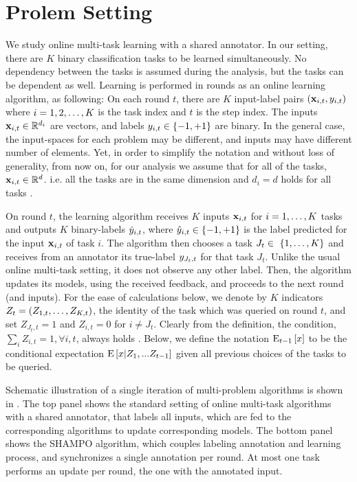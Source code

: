 \section{Prolem Setting}
\label{sec:setting}
We study online multi-task learning with a shared annotator. In our setting, there are
$K$  binary classification tasks to be learned simultaneously. 
No dependency between the tasks is assumed during the analysis, but the tasks can be dependent as well. 
Learning is performed in rounds as an online learning algorithm, as following: 
On each round $t$, there are $K$ input-label pairs
$(\mathbf{x}_{i,t},y_{i,t})$ where $i=1,2, \ldots , K$ is the task index and $t$ is the step index. The inputs $\mathbf{x}_{i,t}\in\mathbb{R}^{d_i}$ are
vectors, and labels  $y_{i,t}\in\{-1,+1\}$ are binary. In the general
case, the input-spaces for each problem may be different, and inputs may
have different number of elements. Yet, in order to  simplify the notation and without loss of generality,  from now
on, for our analysis we assume that for all of the tasks, $\mathbf{x}_{i,t}\in\mathbb{R}^{d}$. i.e. all the tasks are in the same dimension and   $d_i = d$ holds for all tasks . 


On round $t$, the learning algorithm receives $K$ inputs $\mathbf{x}_{i,t}$
for $i=1 , \ldots , K$ tasks and outputs $K$ binary-labels $\hat{y}_{i,t}$, where
$\hat{y}_{i,t}\in\{-1,+1\}$ is the label predicted for the input
$\mathbf{x}_{i,t}$ of task $i$. The algorithm then chooses a task $J_t \in\
\{1 , \ldots , K\}$ and receives from an annotator its true-label
$y_{J_t,t}$ for that task $J_t$. Unlike the usual online multi-task setting, it  does not observe any other
label. Then, the algorithm updates its models, using the received feedback, and proceeds to the
next round (and inputs).  For the ease of calculations below, we denote
by $K$ indicators $Z_t=\left({ Z_{1,t} , \ldots , Z_{K,t}}\right)$, the
identity of the task which was queried on round $t$, and set
$Z_{J_t,t}=1$ and $Z_{i,t}=0$ for $i\ne J_t$. Clearly from the definition, the condition, $\sum_i
Z_{i,t}=1 ,\forall{i,t}$, always holds . Below, we define the notation ${\rm E}_{t-1}\left[{x}\right]$ to be the
conditional expectation ${\rm E}\left[{x \vert Z_{1},...Z_{t-1}}\right]$ given all
previous choices of the tasks to be queried.


Schematic illustration of a single iteration of multi-problem algorithms is shown in . The top panel shows the standard
setting of online multi-task algorithms with a shared annotator, that labels all inputs, which are fed to the corresponding algorithms to update corresponding models. The
bottom panel shows the SHAMPO algorithm, which couples labeling
annotation and learning process, and synchronizes a single annotation
per round.  At most one task performs an update per round, the one
with the annotated input.

